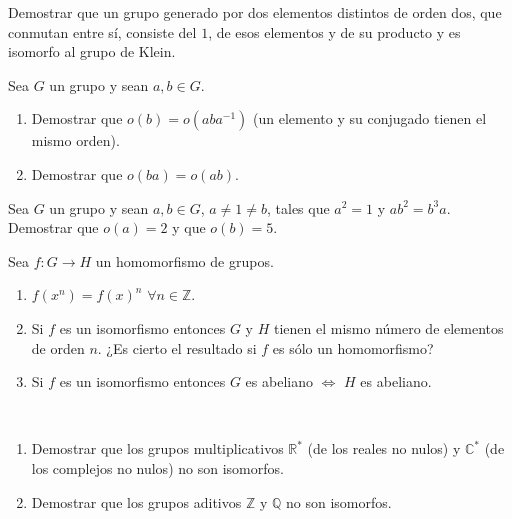 \begin{ejercicio}\label{ej:2.32}
    Demostrar que un grupo generado por dos elementos distintos de orden dos, que conmutan entre sí, consiste del $1$, de esos elementos y de su producto y es isomorfo al grupo de Klein.
\end{ejercicio}

\begin{ejercicio}\label{ej:2.33}
    Sea $G$ un grupo y sean $a, b \in G$.
    \begin{enumerate}
        \item Demostrar que $o(b) = o(aba^{-1})$ (un elemento y su conjugado tienen el mismo orden).
        \item Demostrar que $o(ba) = o(ab)$.
    \end{enumerate}
\end{ejercicio}

\begin{ejercicio}\label{ej:2.34}
    Sea $G$ un grupo y sean $a, b \in G$, $a \neq 1 \neq b$, tales que $a^2 = 1$ y $ab^2 = b^3a$. Demostrar que $o(a) = 2$ y que $o(b) = 5$.
\end{ejercicio}

\begin{ejercicio}\label{ej:2.35}
    Sea $f : G \to H$ un homomorfismo de grupos.
    \begin{enumerate}
        \item $f(x^n) = f(x)^n$ $\forall n \in \mathbb{Z}$.
        \item Si $f$ es un isomorfismo entonces $G$ y $H$ tienen el mismo número de elementos de orden $n$. ¿Es cierto el resultado si $f$ es sólo un homomorfismo?
        \item Si $f$ es un isomorfismo entonces $G$ es abeliano $\Leftrightarrow$ $H$ es abeliano.
    \end{enumerate}
\end{ejercicio}

\begin{ejercicio}\label{ej:2.36}~
    \begin{enumerate}
        \item Demostrar que los grupos multiplicativos $\mathbb{R}^{\ast}$ (de los reales no nulos) y $\mathbb{C}^{\ast}$ (de los complejos no nulos) no son isomorfos.
        \item Demostrar que los grupos aditivos $\mathbb{Z}$ y $\mathbb{Q}$ no son isomorfos.
    \end{enumerate}
\end{ejercicio}

